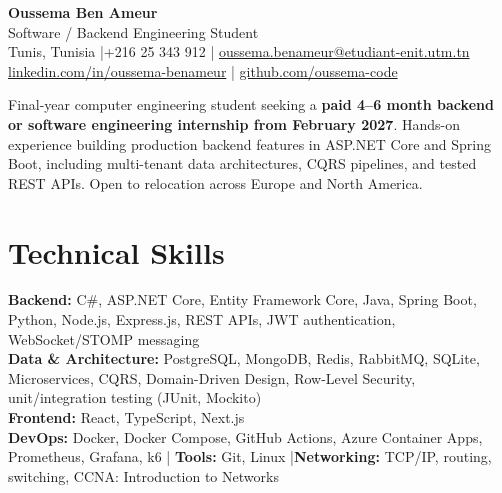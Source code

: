 \documentclass[10pt,a4paper]{article}
\begin{document}
\begin{center}
  {\LARGE\textbf{Oussema Ben Ameur}}\\[-1pt]
  {\normalsize Software / Backend Engineering Student}\\[2pt]
  Tunis, Tunisia \enspace|\enspace +216 25 343 912 \enspace|\enspace
  \href{mailto:oussema.benameur@etudiant-enit.utm.tn}{oussema.benameur@etudiant-enit.utm.tn}\\[-1pt]
  \href{https://www.linkedin.com/in/oussema-benameur-07151b246/}{linkedin.com/in/oussema-benameur} \enspace|\enspace
  \href{https://github.com/oussema-code}{github.com/oussema-code}
\end{center}

\vspace{-4pt}
Final-year computer engineering student seeking a \textbf{paid 4--6 month backend or software engineering internship from February 2027}. Hands-on experience building production backend features in ASP.NET Core and Spring Boot, including multi-tenant data architectures, CQRS pipelines, and tested REST APIs. Open to relocation across Europe and North America.

\section{Technical Skills}
\textbf{Backend:} C\#, ASP.NET Core, Entity Framework Core, Java, Spring Boot, Python, Node.js, Express.js, REST APIs, JWT authentication, WebSocket/STOMP messaging\\
\textbf{Data \& Architecture:} PostgreSQL, MongoDB, Redis, RabbitMQ, SQLite, Microservices, CQRS, Domain-Driven Design, Row-Level Security, unit/integration testing (JUnit, Mockito)\\
\textbf{Frontend:} React, TypeScript, Next.js\\
\textbf{DevOps:} Docker, Docker Compose, GitHub Actions, Azure Container Apps, Prometheus, Grafana, k6 \enspace|\enspace
\textbf{Tools:} Git, Linux \enspace|\enspace \textbf{Networking:} TCP/IP, routing, switching, CCNA: Introduction to Networks
\end{document}
